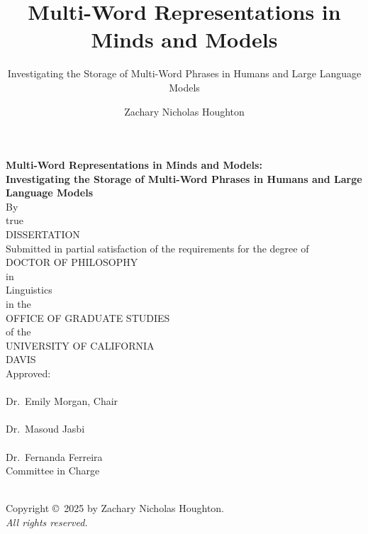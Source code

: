 \documentclass[
  12pt,
  letterpaper,
]{scrreport}
\title{Multi-Word Representations in Minds and Models}
\subtitle{Investigating the Storage of Multi-Word Phrases in Humans and
Large Language Models}
\author{Zachary Nicholas Houghton}
\date{}
\begin{document}
\cleardoublepage
\thispagestyle{plain}
\begin{center}
   \null\vfill
   \textbf{%
      Multi-Word Representations in Minds and Models:\\
	  Investigating the Storage of Multi-Word Phrases in Humans and Large
  Language Models
   }%
   \\
   \bigskip
   By \\
   \bigskip
   {true}
\\   
   DISSERTATION \\
   \bigskip
   Submitted in partial satisfaction of the requirements for the
   degree of \\
   \bigskip
   DOCTOR OF PHILOSOPHY \\
   \bigskip
   in \\
   \bigskip
   {Linguistics} \\ 
      \bigskip
   in the \\
   \bigskip
   OFFICE OF GRADUATE STUDIES \\
   \bigskip        
   of the \\
   \bigskip
   UNIVERSITY OF CALIFORNIA \\
   \bigskip
   DAVIS \\
   \bigskip
   Approved: \\
   \bigskip
   \bigskip
   \makebox[3in]{\hrulefill} \\
   Dr.~Emily Morgan, Chair \\
   \bigskip
   \bigskip
   \makebox[3in]{\hrulefill} \\
   Dr.~Masoud Jasbi \\
   \bigskip
   \bigskip
   \makebox[3in]{\hrulefill} \\
   Dr.~Fernanda Ferreira \\
   \bigskip
   Committee in Charge \\
    \\
   \vfill
\end{center}


\newpage
{}
\setcounter{savedpage}{\value{page}}

\thispagestyle{empty}
\begin{titlepage}
\begin{center}
  Copyright \copyright\ 2025 by Zachary Nicholas Houghton. \\
  \textit{All rights reserved.}
\end{center}
\end{titlepage}
\end{document}
